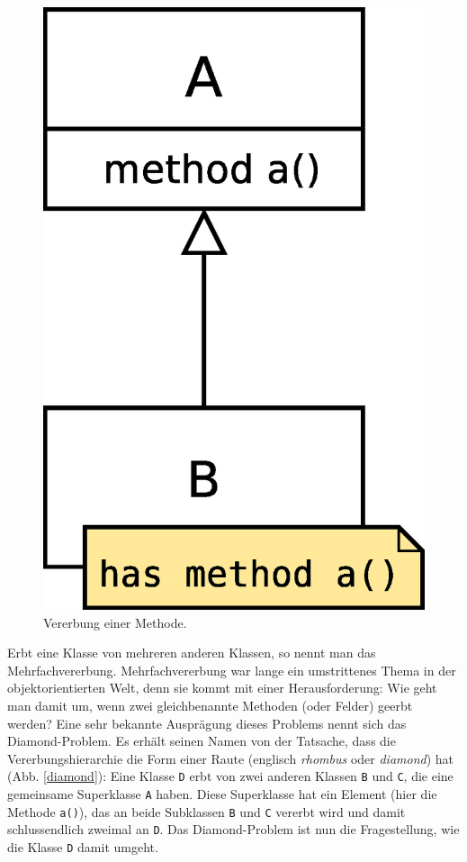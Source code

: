 \begin{figure}[h]
\centering
 \includegraphics[scale = 0.3]{pictures/inheritance}
 \caption{Vererbung einer Methode.}
 \label{inheritance}
\end{figure}

Erbt eine Klasse von mehreren anderen Klassen, so nennt man das Mehrfachvererbung. Mehrfachvererbung war lange ein umstrittenes Thema in der objektorientierten Welt, denn sie kommt mit einer Herausforderung: Wie geht man damit um, wenn zwei gleichbenannte Methoden (oder Felder) geerbt werden? Eine sehr bekannte Ausprägung dieses Problems nennt sich das Diamond-Problem. Es erhält seinen Namen von der Tatsache, dass die Vererbungshierarchie die Form einer Raute (englisch \emph{rhombus} oder \emph{diamond}) hat (Abb. \ref{diamond}):
Eine Klasse \texttt{D} erbt von zwei anderen Klassen \texttt{B} und \texttt{C}, die eine gemeinsame Superklasse \texttt{A} haben. Diese Superklasse hat ein Element (hier die Methode \texttt{a()}), das an beide Subklassen \texttt{B} und \texttt{C} vererbt wird und damit schlussendlich zweimal an \texttt{D}. Das Diamond-Problem ist nun die Fragestellung, wie die Klasse \texttt{D} damit umgeht.

